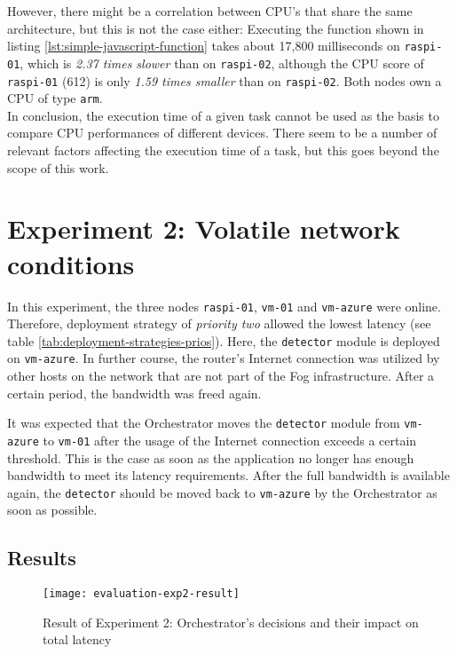 However, there might be a correlation between CPU's that share the same architecture, but this is not the case either:
Executing the function shown in listing \ref{lst:simple-javascript-function} takes about 17,800 milliseconds on \texttt{raspi-01}, which is \textit{2.37 times slower} than on \texttt{raspi-02}, although the CPU score of \texttt{raspi-01} (612) is only \textit{1.59 times smaller} than on \texttt{raspi-02}. Both nodes own a CPU of type \texttt{arm}.\\

In conclusion, the execution time of a given task cannot be used as the basis to compare CPU performances of different devices.
There seem to be a number of relevant factors affecting the execution time of a task, but this goes beyond the scope of this work.




\section{Experiment 2: Volatile network conditions}

In this experiment, the three nodes \texttt{raspi-01}, \texttt{vm-01} and \texttt{vm-azure} were online. Therefore, deployment strategy of \textit{priority two} allowed the lowest latency (see table \ref{tab:deployment-strategies-prios}).
Here, the \texttt{detector} module is deployed on \texttt{vm-azure}.
In further course, the router's Internet connection was utilized by other hosts on the network that are not part of the Fog infrastructure.
After a certain period, the bandwidth was freed again.


It was expected that the Orchestrator moves the \texttt{detector} module from \texttt{vm-azure} to \texttt{vm-01} after the usage of the Internet connection exceeds a certain threshold.
This is the case as soon as the application no longer has enough bandwidth to meet its latency requirements.
After the full bandwidth is available again, the \texttt{detector} should be moved back to \texttt{vm-azure} by the Orchestrator as soon as possible.


\subsection*{Results}

\begin{figure}[htb]
    \centering
    \texttt{[image: evaluation-exp2-result]}
    \caption{Result of Experiment 2: Orchestrator's decisions and their impact on total latency}
    \label{fig:evaluation-exp2-results}
\end{figure}

